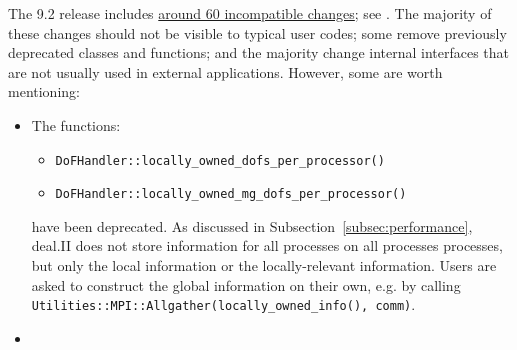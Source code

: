 \documentclass{ansarticle-preprint}
\begin{document}
The 9.2 release includes
\href{https://dealii.org/developer/doxygen/deal.II/changes_between_9_1_1_and_9_2_0.html}
     {around 60 incompatible changes}; see \cite{changes92}. The majority of these changes
should not be visible to typical user codes; some remove previously
deprecated classes and functions; and the majority change internal
interfaces that are not usually used in external
applications. However, some are worth mentioning:
\begin{itemize}
\item The functions:
\begin{itemize}
\item \texttt{DoFHandler::locally\_owned\_dofs\_per\_processor()}
\item \texttt{DoFHandler::locally\_owned\_mg\_dofs\_per\_processor()}
\end{itemize} have been deprecated. As discussed in Subsection~\ref{subsec:performance}, deal.II does not store information for all processes on all processes processes, but only the local information or the locally-relevant information. Users are asked to construct the global information on their own, e.g. by calling \texttt{Utilities::MPI::Allgather(locally\_owned\_info(), comm)}.
\item 

\end{itemize}
\end{document}
